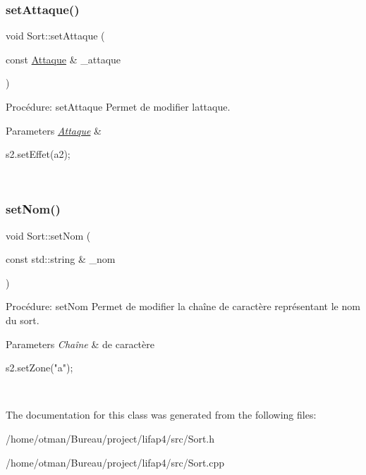 \subsubsection{\texorpdfstring{set\+Attaque()}{setAttaque()}}
{\footnotesize\ttfamily void Sort\+::set\+Attaque (\begin{DoxyParamCaption}\item[{const \hyperlink{classAttaque}{Attaque} \&}]{\+\_\+attaque }\end{DoxyParamCaption})}



Procédure\+: set\+Attaque Permet de modifier l\textquotesingle{}attaque. 


\begin{DoxyParams}{Parameters}
{\em \hyperlink{classAttaque}{Attaque}} & 
\begin{DoxyCode}
s2.setEffet(a2);
\end{DoxyCode}
 \\
\hline
\end{DoxyParams}
\mbox{\label{classSort_af1eb5e9ab593b1c6b9e1d94ad1117b4f}} 
\subsubsection{\texorpdfstring{set\+Nom()}{setNom()}}
{\footnotesize\ttfamily void Sort\+::set\+Nom (\begin{DoxyParamCaption}\item[{const std\+::string \&}]{\+\_\+nom }\end{DoxyParamCaption})}



Procédure\+: set\+Nom Permet de modifier la chaîne de caractère représentant le nom du sort. 


\begin{DoxyParams}{Parameters}
{\em Chaîne} & de caractère 
\begin{DoxyCode}
s2.setZone(\textcolor{stringliteral}{"a"});
\end{DoxyCode}
 \\
\hline
\end{DoxyParams}


The documentation for this class was generated from the following files\+:\begin{DoxyCompactItemize}
\item 
/home/otman/\+Bureau/project/lifap4/src/Sort.\+h\item 
/home/otman/\+Bureau/project/lifap4/src/Sort.\+cpp\end{DoxyCompactItemize}
